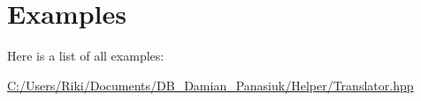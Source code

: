 \section{Examples}
Here is a list of all examples\+:\begin{DoxyCompactItemize}
\item 
\mbox{\hyperlink{_c_1_2_users_2_riki_2_documents_2_d_b__damian__panasiuk_2_helper_2_translator_8hpp-example}{C\+:/\+Users/\+Riki/\+Documents/\+D\+B\+\_\+\+Damian\+\_\+\+Panasiuk/\+Helper/\+Translator.\+hpp}}
\end{DoxyCompactItemize}
